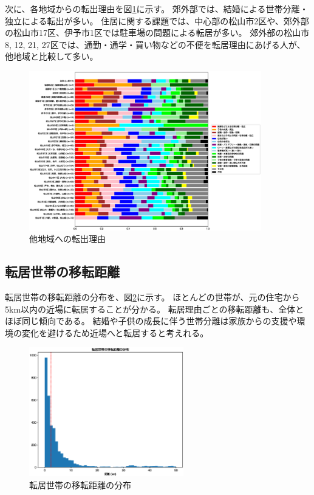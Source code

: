 \documentclass[a4paper,12pt, uplatex]{jsbook}
\begin{document}
次に、各地域からの転出理由を図\ref{fig:reason_ratio_go}に示す。
郊外部では、結婚による世帯分離・独立による転出が多い。
住居に関する課題では、中心部の松山市2区や、郊外部の松山市17区、伊予市1区では駐車場の問題による転居が多い。
郊外部の松山市8, 12, 21, 27区では、通勤・通学・買い物などの不便を転居理由にあげる人が、他地域と比較して多い。
%
\begin{figure}[H]
    \centering
    \includegraphics[width=0.9\textwidth]{picture/reason_ratio_go.eps}
    \caption{他地域への転出理由}
    \label{fig:reason_ratio_go}
\end{figure}

\clearpage
\subsection{転居世帯の移転距離}
転居世帯の移転距離の分布を、図\ref{fig:relocation_dist}に示す。
ほとんどの世帯が、元の住宅から5km以内の近場に転居することが分かる。
転居理由ごとの移転距離も、全体とほぼ同じ傾向である。
結婚や子供の成長に伴う世帯分離は家族からの支援や環境の変化を避けるため近場へと転居すると考えれる。
%
\begin{figure}[H]
    \centering
    \includegraphics[width=0.6\textwidth]{picture/distance_near.eps}
    \caption{転居世帯の移転距離の分布}
    \label{fig:relocation_dist}
\end{figure}
\end{document}
